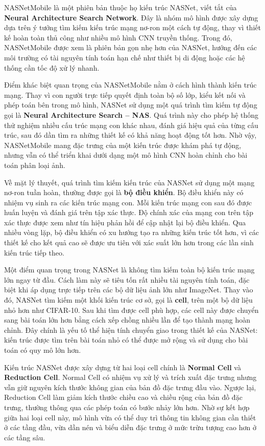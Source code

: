\documentclass[
]{article}
\begin{document}
NASNetMobile là một phiên bản thuộc họ kiến trúc NASNet, viết tắt của
\textbf{Neural Architecture Search Network}. Đây là nhóm mô hình được
xây dựng dựa trên ý tưởng tìm kiếm kiến trúc mạng nơ-ron một cách tự
động, thay vì thiết kế hoàn toàn thủ công như nhiều mô hình CNN truyền
thống. Trong đó, NASNetMobile được xem là phiên bản gọn nhẹ hơn của
NASNet, hướng đến các môi trường có tài nguyên tính toán hạn chế như
thiết bị di động hoặc các hệ thống cần tốc độ xử lý nhanh.

Điểm khác biệt quan trọng của NASNetMobile nằm ở cách hình thành kiến
trúc mạng. Thay vì con người trực tiếp quyết định toàn bộ số lớp, kiểu
kết nối và phép toán bên trong mô hình, NASNet sử dụng một quá trình tìm
kiếm tự động gọi là \textbf{Neural Architecture Search -- NAS}. Quá
trình này cho phép hệ thống thử nghiệm nhiều cấu trúc mạng con khác
nhau, đánh giá hiệu quả của từng cấu trúc, sau đó dần tìm ra những thiết
kế có khả năng hoạt động tốt hơn. Nhờ vậy, NASNetMobile mang đặc trưng
của một kiến trúc được khám phá tự động, nhưng vẫn có thể triển khai
dưới dạng một mô hình CNN hoàn chỉnh cho bài toán phân loại ảnh.

Về mặt lý thuyết, quá trình tìm kiếm kiến trúc của NASNet sử dụng một
mạng nơ-ron tuần hoàn, thường được gọi là \textbf{bộ điều khiển}. Bộ
điều khiển này có nhiệm vụ sinh ra các kiến trúc mạng con. Mỗi kiến trúc
mạng con sau đó được huấn luyện và đánh giá trên tập xác thực. Độ chính
xác của mạng con trên tập xác thực được xem như tín hiệu phản hồi để cập
nhật lại bộ điều khiển. Qua nhiều vòng lặp, bộ điều khiển có xu hướng
tạo ra những kiến trúc tốt hơn, vì các thiết kế cho kết quả cao sẽ được
ưu tiên với xác suất lớn hơn trong các lần sinh kiến trúc tiếp theo.

Một điểm quan trọng trong NASNet là không tìm kiếm toàn bộ kiến trúc
mạng lớn ngay từ đầu. Cách làm này sẽ tiêu tốn rất nhiều tài nguyên tính
toán, đặc biệt khi áp dụng trực tiếp trên các bộ dữ liệu ảnh lớn như
ImageNet. Thay vào đó, NASNet tìm kiếm một khối kiến trúc cơ sở, gọi là
\textbf{cell}, trên một bộ dữ liệu nhỏ hơn như CIFAR-10. Sau khi tìm
được cell phù hợp, các cell này được chuyển sang bài toán lớn hơn bằng
cách xếp chồng nhiều lần để tạo thành mạng hoàn chỉnh. Đây chính là yếu
tố thể hiện tính chuyển giao trong thiết kế của NASNet: kiến trúc được
tìm trên bài toán nhỏ có thể được mở rộng và sử dụng cho bài toán có quy
mô lớn hơn.

Kiến trúc NASNet được xây dựng từ hai loại cell chính là \textbf{Normal
Cell} và \textbf{Reduction Cell}. Normal Cell có nhiệm vụ xử lý và trích
xuất đặc trưng nhưng vẫn giữ nguyên kích thước không gian của bản đồ đặc
trưng đầu vào. Ngược lại, Reduction Cell làm giảm kích thước chiều cao
và chiều rộng của bản đồ đặc trưng, thường thông qua các phép toán có
bước nhảy lớn hơn. Nhờ sự kết hợp giữa hai loại cell này, mô hình vừa có
thể duy trì thông tin không gian cần thiết ở các tầng đầu, vừa dần nén
và biểu diễn đặc trưng ở mức trừu tượng cao hơn ở các tầng sâu.
\end{document}
